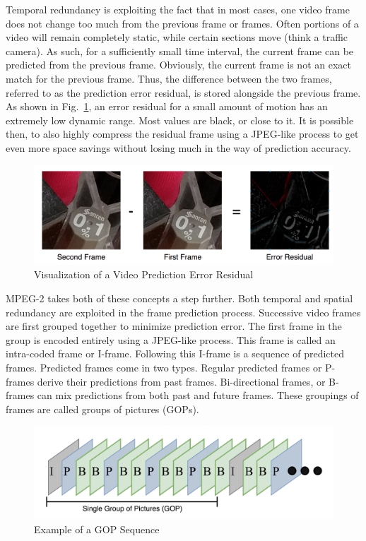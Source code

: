 Temporal redundancy is exploiting the fact that in most cases, one video frame does not change too much from the previous frame or frames. Often portions of a video will remain completely static, while certain sections move (think a traffic camera). As such, for a sufficiently small time interval, the current frame can be predicted from the previous frame. Obviously, the current frame is not an exact match for the previous frame. Thus, the difference between the two frames, referred to as the prediction error residual, is stored alongside the previous frame. As shown in Fig.~\ref{residualvis}, an error residual for a small amount of motion has an extremely low dynamic range. Most values are black, or close to it. It is possible then, to also highly compress the residual frame using a JPEG-like process to get even more space savings without losing much in the way of prediction accuracy.

\begin{figure}[htbp]
\centerline{\includegraphics[width=0.9\linewidth]{Background/error_residual_vis.png}}
\caption{Visualization of a Video Prediction Error Residual}
\label{residualvis}
\end{figure}

MPEG-2 takes both of these concepts a step further. Both temporal and spatial redundancy are exploited in the frame prediction process. Successive video frames are first grouped together to minimize prediction error. The first frame in the group is encoded entirely using a JPEG-like process. This frame is called an intra-coded frame or I-frame. Following this I-frame is a sequence of predicted frames. Predicted frames come in two types. Regular predicted frames or P-frames derive their predictions from past frames. Bi-directional frames, or B-frames can mix predictions from both past and future frames. These groupings of frames are called groups of pictures (GOPs).

\begin{figure}[htbp]
\centerline{\includegraphics[width=0.9\linewidth]{Background/gop_example.png}}
\caption{Example of a GOP Sequence}
\label{exampleGOP}
\end{figure}


